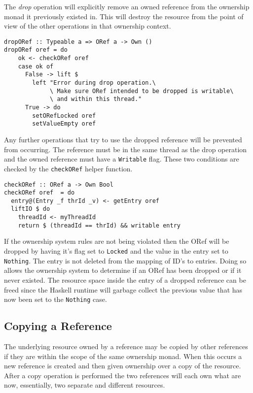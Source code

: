 \documentclass[onehalf,11pt]{beavtex}
\begin{document}
The \textit{drop} operation will explicitly remove an owned reference from the
ownership monad it previously existed in.
This will destroy the resource from the point of view of the other operations
in that ownership context.

\begin{verbatim}
dropORef :: Typeable a => ORef a -> Own ()
dropORef oref = do
    ok <- checkORef oref
    case ok of
      False -> lift $
        left "Error during drop operation.\
             \ Make sure ORef intended to be dropped is writable\
             \ and within this thread."
      True -> do
        setORefLocked oref
        setValueEmpty oref
\end{verbatim}

Any further operations that try to use the dropped reference will be prevented
from occurring.
The reference must be in the same thread as the drop operation and the owned
reference must have a \texttt{Writable} flag. These two conditions are checked
by the \texttt{checkORef} helper function.

\begin{verbatim}
checkORef :: ORef a -> Own Bool
checkORef oref  = do
  entry@(Entry _f thrId _v) <- getEntry oref
  liftIO $ do
    threadId <- myThreadId
    return $ (threadId == thrId) && writable entry
\end{verbatim}

If the ownership system rules are not being violated then the ORef will be
dropped by having it's flag set to \texttt{Locked} and the value in the
entry set to \texttt{Nothing}. The entry is not deleted from the mapping of
ID's to entries. Doing so allows the ownership system to determine if an ORef
has been dropped or if it never existed.
The resource space inside the entry of a dropped reference can be freed since
the Haskell runtime will garbage collect the previous value that has now been
set to the \texttt{Nothing} case.

\subsection{Copying a Reference}

The underlying resource owned by a reference may be copied by other references
if they are within the scope of the same ownership monad.  When this occurs a new
reference is created and then given ownership over a copy of the resource.
After a copy operation is performed the two references will each own what are now,
essentially, two separate and different resources.
\end{document}
